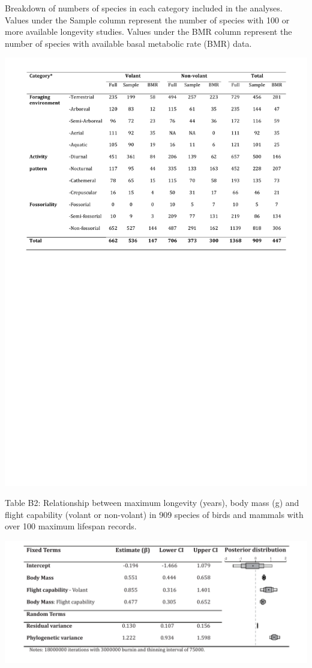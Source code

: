 \begin{table}[h]
  \caption[Table B1.]{Breakdown of numbers of species in each category included in the analyses. Values under the Sample column represent the number of species with 100 or more available longevity studies. Values under the BMR column represent the number of species with available basal metabolic rate (BMR) data.}
  \label{tbl:Table B1.}
  \includegraphics[width=\linewidth]{ch3-longevity-appendix/Table_B1.pdf}
\end{table}


\begin{table}[h]
  \caption[Table B2.]{Table B2: Relationship between maximum longevity (years), body mass (g) and flight capability (volant or non-volant) in 909 species of birds and mammals with over 100 maximum lifespan records.}
  \label{tbl:Table B2.}
  \includegraphics[width=\linewidth]{ch3-longevity-appendix/Table_B2.pdf}
\end{table}


